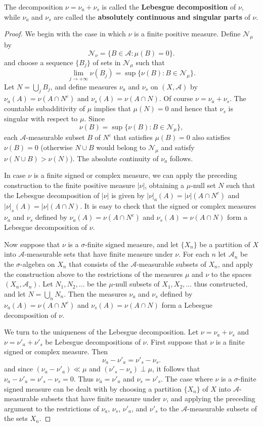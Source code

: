 The decomposition $\nu=\nu_a+\nu_s$ is called the \textbf{Lebesgue decomposition} of $\nu$, while $\nu_a$ and $\nu_s$ are called the \textbf{absolutely continuous and singular parts} of $\nu$.
\begin{proof}
We begin with the case in which $\nu$ is a finite positive measure. Define $\mathcal{N}_\mu$ by
\[\mathcal{N}_\nu=\{B\in\mathcal{A}:\mu(B)=0\}.\]
and choose a sequence $\{B_j\}$ of sets in $\mathcal{N}_\mu$ such that
\[\lim_{j\to+\infty}\nu(B_j)=\sup\{\nu(B):B\in\mathcal{N}_\mu\}.\]
Let $N=\bigcup_jB_j$, and define measures $\nu_a$ and $\nu_s$ on $(X,\mathcal{A})$ by $\nu_a(A)=\nu(A\cap N^c)$ and $\nu_s(A)=\nu(A\cap N)$. Of course $\nu=\nu_a+\nu_s$. The countable subadditivity of $\mu$ implies that $\mu(N)=0$ and hence that $\nu_s$ is singular with respect to $\mu$. Since
\[\nu(B)=\sup\{\nu(B):B\in\mathcal{N}_\mu\},\]
each $\mathcal{A}$-measurable subset $B$ of $N^c$ that satisfies $\mu(B)=0$ also satisfies $\nu(B)=0$ (otherwise $N\cup B$ would belong to $\mathcal{N}_\mu$ and satisfy $\nu(N\cup B)>\nu(N)$). The absolute continuity of $\nu_a$ follows.\par
In case $\nu$ is a finite signed or complex measure, we can apply the preceding construction to the finite positive measure $|\nu|$, obtaining a $\mu$-null set $N$ such that the Lebesgue decomposition of $|\nu|$ is given by $|\nu|_a(A)=|\nu|(A\cap N^c)$ and $|\nu|_s(A)=|\nu|(A\cap N)$. It is easy to check that the signed or complex measures $\nu_a$ and $\nu_s$ defined by $\nu_a(A)=\nu(A\cap N^c)$ and $\nu_s(A)=\nu(A\cap N)$ form a Lebesgue decomposition of $\nu$.\par
Now suppose that $\nu$ is a $\sigma$-finite signed measure, and let $\{X_n\}$ be a partition of $X$ into $\mathcal{A}$-measurable sets that have finite measure under $\nu$. For each $n$ let $\mathcal{A}_n$ be the $\sigma$-algebra on $X_n$ that consists of the $\mathcal{A}$-measurable subsets of $X_n$, and apply the construction above to the restrictions of the measures $\mu$ and $\nu$ to the spaces $(X_n,\mathcal{A}_n)$. Let $N_1,N_2,\dots$ be the $\mu$-null subsets of $X_1,X_2,\dots$ thus constructed,
and let $N=\bigcup_nN_n$. Then the measures $\nu_a$ and $\nu_s$ defined by $\nu_a(A)=\nu(A\cap N^c)$ and $\nu_s(A)=\nu(A\cap N)$ form a Lebesgue decomposition of $\nu$.\par
We turn to the uniqueness of the Lebesgue decomposition. Let $\nu=\nu_a+\nu_s$ and $\nu=\nu'_a+\nu'_s$ be Lebesgue decompositions of $\nu$. First suppose that $\nu$ is a finite signed or complex measure. Then
\[\nu_a-\nu'_a=\nu'_s-\nu_s.\]
and since $(\nu_a-\nu'_a)\ll\mu$ and $(\nu'_s-\nu_s)\perp\mu$, it follows that $\nu_a-\nu'_a=\nu'_s-\nu_s=0$. Thus $\nu_a=\nu'_a$ and $\nu_s=\nu'_s$. The case where $\nu$ is a $\sigma$-finite signed measure can be dealt with by choosing a partition $\{X_n\}$ of $X$ into $\mathcal{A}$-measurable subsets that have finite measure under $\nu$, and applying the preceding argument to the restrictions of $\nu_a$, $\nu_s$, $\nu'_a$, and $\nu'_s$ to the $\mathcal{A}$-measurable subsets of the sets $X_n$.
\end{proof}
